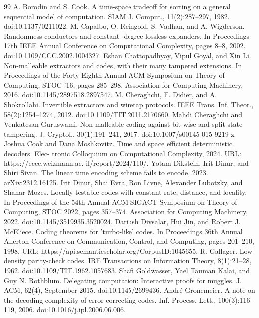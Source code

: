 \begin{thebibliography}{99}
 A. Borodin and S. Cook. A time-space tradeoff for sorting on a general sequential model of computation. SIAM J. Comput., 11(2):287–297, 1982. doi:10.1137/0211022.
 M. Capalbo, O. Reingold, S. Vadhan, and A. Wigderson. Randomness conductors and constant- degree lossless expanders. In Proceedings 17th IEEE Annual Conference on Computational Complexity, pages 8–8, 2002. doi:10.1109/CCC.2002.1004327.
 Eshan Chattopadhyay, Vipul Goyal, and Xin Li. Non-malleable extractors and codes, with their many tampered extensions. In Proceedings of the Forty-Eighth Annual ACM Symposium on Theory of Computing, STOC ’16, pages 285–298. Association for Computing Machinery, 2016. doi:10.1145/2897518.2897547.
 M. Cheraghchi, F. Didier, and A. Shokrollahi. Invertible extractors and wiretap protocols. IEEE Trans. Inf. Theor., 58(2):1254–1274, 2012. doi:10.1109/TIT.2011.2170660.
 Mahdi Cheraghchi and Venkatesan Guruswami. Non-malleable coding against bit-wise and split-state tampering. J. Cryptol., 30(1):191–241, 2017. doi:10.1007/s00145-015-9219-z.
 Joshua Cook and Dana Moshkovitz. Time and space efficient deterministic decoders. Elec- tronic Colloquium on Computational Complexity, 2024. URL: https://eccc.weizmann.ac. il/report/2024/110/.
 Yotam Dikstein, Irit Dinur, and Shiri Sivan. The linear time encoding scheme fails to encode, 2023. arXiv:2312.16125.
 Irit Dinur, Shai Evra, Ron Livne, Alexander Lubotzky, and Shahar Mozes. Locally testable codes with constant rate, distance, and locality. In Proceedings of the 54th Annual ACM SIGACT Symposium on Theory of Computing, STOC 2022, pages 357–374. Association for Computing Machinery, 2022. doi:10.1145/3519935.3520024.
 Dariush Divsalar, Hui Jin, and Robert J. McEliece. Coding theorems for ’turbo-like’ codes. In Proceedings 36th Annual Allerton Conference on Communication, Control, and Computing, pages 201–210, 1998. URL: https://api.semanticscholar.org/CorpusID:1045655.
 R. Gallager. Low-density parity-check codes. IRE Transactions on Information Theory, 8(1):21–28, 1962. doi:10.1109/TIT.1962.1057683.
 Shafi Goldwasser, Yael Tauman Kalai, and Guy N. Rothblum. Delegating computation: Interactive proofs for muggles. J. ACM, 62(4), September 2015. doi:10.1145/2699436.
 André Gronemeier. A note on the decoding complexity of error-correcting codes. Inf. Process. Lett., 100(3):116–119, 2006. doi:10.1016/j.ipl.2006.06.006.

\end{thebibliography}
